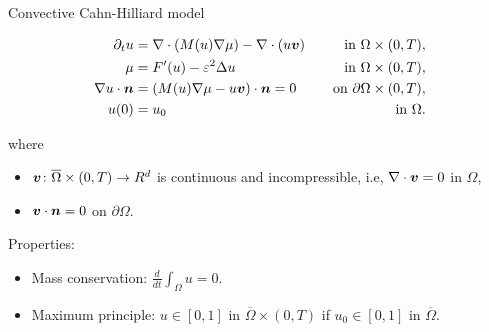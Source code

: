 \begin{frame}{Convective Cahn-Hilliard model}
	\begin{block}{}
	\vspace*{-0.4cm}
	\begin{subequations}
		\begin{align*}
			\partial_t u&=\nabla\cdot\left(M(u)\nabla\mu\right)- \nabla\cdot(u\vv)\quad&\text{in }\Omega\times (0,T),\\
			\mu&=F'(u)-\varepsilon^2\Delta u\quad&\text{in }\Omega\times (0,T),\\
			\nabla u\cdot \boldsymbol{n}&=\left(M(u)\nabla\mu-u\vv\right)\cdot \boldsymbol{n}=0 \quad &\text{on }\partial\Omega\times (0,T),\\
			u(0)&=u_0\quad&\text{in }\Omega.%
		\end{align*}
	\end{subequations}
	\end{block}

	where
	\begin{itemize}
		\item $\boldsymbol{v}\colon\overline{\Omega}\times(0,T)\to\relax R^d$ is continuous and \alert{incompressible}, i.e, $\nabla\cdot\boldsymbol{v}=0$ in $\Omega$,
		\item $\boldsymbol{v}\cdot\boldsymbol{n}=0$ on $\partial\Omega$.
	\end{itemize}
	
	\vspace*{0.3cm}
	Properties:
	\begin{itemize}
		\item \alert{Mass conservation}: $\frac{d}{dt}\int_\Omega u=0$.
		\item \alert{Maximum principle}:  $u\in[0,1]$ in $ \overline\Omega\times (0,T)$ if $u_0\in[0,1]$ in $\overline\Omega$.
	\end{itemize}
\end{frame}

